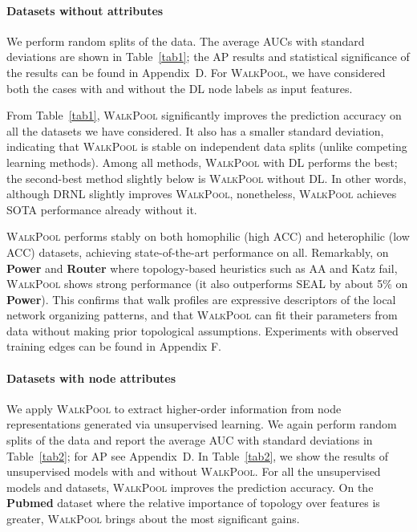\documentclass[11pt]{article}
\newcommand{\walkpool}{\textsc{WalkPool}\xspace}
\newcommand{\UPDATE}[1]{\textcolor{WowColor}{{#1}}}
\newcommand{\fTBD}[1]{\textcolor{SubtleColor}{}\marginnote{\tiny\textcolor{SubtleColor}{ {\tiny } #1}}}
\renewcommand{\fTBD}[1]{}
\renewcommand{\UPDATE}[1]{#1}
\begin{document}
\paragraph{Datasets without attributes} We perform  random splits of the data. The average AUCs with standard deviations are shown in Table~\ref{tab1}; the AP results \UPDATE{and statistical significance of the results} can be found in Appendix~D.\fTBD{Are these reference to appendices correct? Why are they hard coded?} For \walkpool, we have considered both the cases with and without the DL node labels\fTBD{has this been defined?} as input features. 

From Table~\ref{tab1}, \walkpool significantly improves the prediction accuracy on all the datasets we have considered. It also has a smaller standard deviation, indicating that \walkpool is stable on independent data splits (unlike competing learning methods). Among all methods, \walkpool with DL performs the best; the second-best method slightly below is \walkpool without DL. \UPDATE{In other words, although DRNL slightly improves \walkpool, nonetheless, \walkpool achieves SOTA performance already without it.}

\walkpool performs stably on both homophilic (high ACC) and heterophilic (low ACC) datasets, achieving  state-of-the-art performance on all. Remarkably, on \textbf{Power} and \textbf{Router} where topology-based heuristics such as AA and Katz fail, \walkpool shows strong performance (it also outperforms SEAL by about 5\% on \textbf{Power}). This confirms that walk profiles are expressive descriptors of the local network organizing patterns, and that \walkpool can fit their parameters from data without making prior topological assumptions. \UPDATE{Experiments with  observed training edges can be found in Appendix F.}
\vspace{-2mm}
\paragraph{Datasets with node attributes} 
We apply \walkpool to extract higher-order information from node representations generated via unsupervised learning. We again perform  random splits of the data and report the average AUC with standard deviations in Table~\ref{tab2}; for AP see Appendix~D. In Table~\ref{tab2}, we show the results of unsupervised models with and without \walkpool. For all the unsupervised models and datasets, \walkpool improves the prediction accuracy. On the \textbf{Pubmed} dataset where the relative importance of topology over features is greater, \walkpool brings about the most significant gains.
\end{document}

